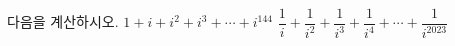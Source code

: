 다음을 계산하시오.
 $1+i+i^2+i^3+\cdots+i^{144}$
 $\dfrac{1}{i}+\dfrac{1}{i^2}+\dfrac{1}{i^3}+\dfrac{1}{i^4}+\cdots+\dfrac{1}{i^{2023}}$
